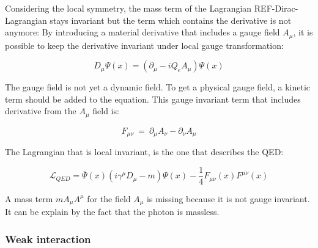       Considering the local symmetry, the mass term of the Lagrangian REF-Dirac-Lagrangian stays invariant but the term which contains the derivative is not anymore:
      By introducing a material derivative that includes a gauge field $A_{\mu}$, it is possible to keep the derivative invariant under local gauge transformation:

      \begin{equation}
        D_{\mu} \Psi\left(x\right) =  \left(\partial_{\mu} - i Q_e A_{\mu}\right) \Psi\left(x\right)
      \end{equation}

   The gauge field is not yet a dynamic field. To get a physical gauge field, a kinetic term should be added to the equation.
   This gauge invariant term that includes derivative from the $A_{\mu}$ field is:
    
    \begin{equation}
      F_{\mu \nu} \ = \ \partial_\mu A_\nu - \partial_\nu A_\mu
    \end{equation}

    The Lagrangian that is local invariant, is the one that describes the QED:

    
    \begin{equation}
    	\mathcal{L}_{QED} =  \overline{\Psi}\left(x\right)\left( i \gamma^\mu D_\mu - m \right) \Psi\left(x\right) - \frac{1}{4}F_{\mu \nu}\left(x\right) F^{\mu \nu}\left(x\right)
    \end{equation}

    A mass term $m A_{\mu} A^{\mu}$ for the field $A_{\mu}$ is missing because it is not gauge invariant. It can be explain by the fact that the photon is massless.




  
    \subsubsection{Weak interaction}

